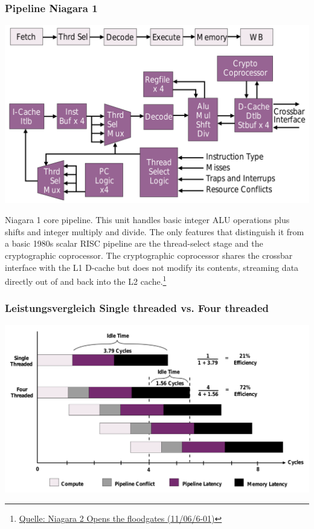 \subsubsection{Pipeline Niagara 1}
\includegraphics[scale=0.3]{mikroprozessoren2/Niagara1.pdf}

Niagara 1 core pipeline. This unit handles basic integer ALU operations plus shifts and integer multiply and divide. The only features that distinguish it from a basic 1980s scalar RISC pipeline are the thread-select stage and the cryptographic coprocessor. The cryptographic coprocessor shares the crossbar interface with the L1 D-cache but does not modify its contents, streaming data directly out of and back into the L2 cache.\footnote{\url{Quelle: Niagara 2 Opens the floodgates (11/06/6-01)}}

\subsubsection{Leistungsvergleich Single threaded vs. Four threaded}
\includegraphics[scale=0.25]{mikroprozessoren2/Niagara1_Leistungsvergleich.pdf}

